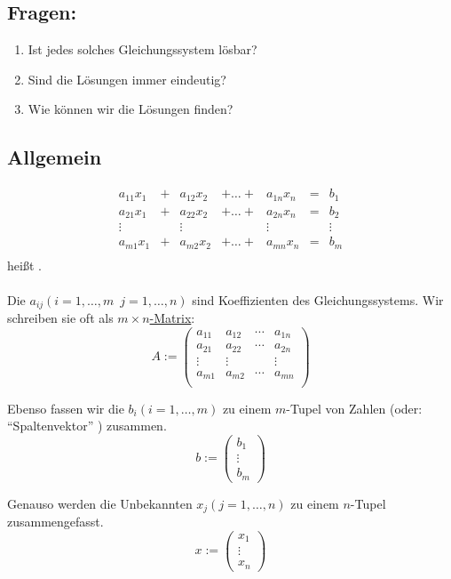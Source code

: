 \subsection{Fragen:}

\begin{enumerate}
\item Ist jedes solches Gleichungssystem lösbar?
\item Sind die Lösungen immer eindeutig?
\item Wie können wir die Lösungen finden?
\end{enumerate}

\subsection{Allgemein}

\[
\begin{matrix}
a_{11} x_1 & + & a_{12} x_2 & +  \ldots  + & a_{1n} x_n & = & b_1 \\
a_{21} x_1 & + & a_{22} x_2 & +  \ldots  + & a_{2n} x_n & = & b_2 \\
\vdots &  & \vdots &    & \vdots &  & \vdots \\
a_{m1} x_1 & + & a_{m2} x_2 & +  \ldots  + & a_{mn} x_n & = & b_m \\
\end{matrix}
\]
heißt  . \\
\\
Die \( a_{ij} (i= 1, \dots , m \enspace j=1, \dots , n) \) sind Koeffizienten des Gleichungssystems. Wir schreiben sie oft als \underline{ \( m \times n \)-Matrix}:
\[
A := \begin{pmatrix}
a_{11} & a_{12} & \cdots & a_{1n} \\
a_{21} & a_{22} & \cdots & a_{2n} \\
\vdots & \vdots &  & \vdots \\
a_{m1} & a_{m2} & \cdots & a_{mn} \\
\end{pmatrix}
\]

Ebenso fassen wir die \( b_i (i=1, \dots, m) \) zu einem \( m \)-Tupel von Zahlen (oder:  \enquote{Spaltenvektor} ) zusammen.
\[
b := \begin{pmatrix}
b_1 \\ \vdots \\ b_m
\end{pmatrix}
\]

Genauso werden die Unbekannten \( x_j (j= 1, \dots , n ) \) zu einem \( n \)-Tupel zusammengefasst.
\[
x := \begin{pmatrix}
x_1 \\ \vdots \\ x_n
\end{pmatrix}
\]

